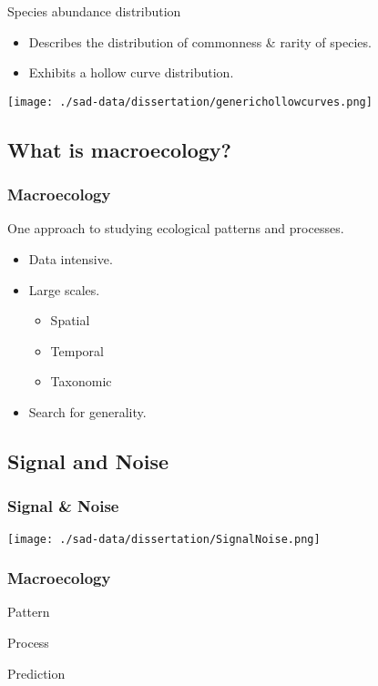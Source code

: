 \documentclass[14pt]{beamer}
\begin{document}
\begin{frame}
Species abundance distribution
\begin{itemize}
\item Describes the distribution of commonness \& rarity of species.
\item Exhibits a hollow curve distribution.
\end{itemize}
\texttt{[image: ./sad-data/dissertation/generichollowcurves.png]}
\end{frame}

\subsection{What is macroecology?}
\begin{frame}[t]
\frametitle{Macroecology}
\normalsize One approach to studying ecological patterns and processes.\\
\begin{itemize}
\item Data intensive.
\item Large scales.
\begin{itemize}
\item Spatial
\item Temporal
\item Taxonomic
\end{itemize}
\item Search for generality.
\end{itemize}
\end{frame}


\subsection{Signal and Noise}
\begin{frame}[t]
\frametitle{Signal \& Noise}
\begin{center}
\texttt{[image: ./sad-data/dissertation/SignalNoise.png]}
\end{center}
\end{frame}

\begin{frame}
\frametitle{Macroecology}
\begin{Huge}
\begin{center}

Pattern 

\MVArrowDown{}  

Process  

\MVArrowDown{}
 
Prediction

\end{center}
\end{Huge}
\end{frame}
\end{document}
